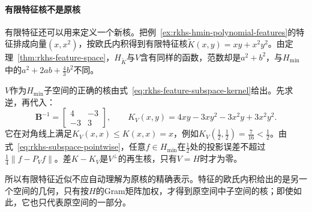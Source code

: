 \paragraph{有限特征核不是原核}

有限特征还可以用来定义一个新核。把例~\ref{ex:rkhs-hmin-polynomial-features}的特征排成向量$(x,x^2)$，按欧氏内积得到有限特征核$\widetilde K(x,y)=xy+x^2y^2$。由定理~\ref{thm:rkhs-feature-space}，$H_{\widetilde K}$与$V$含有同样的函数，范数却是$a^2+b^2$，与$H_{\min}$中的$a^2+2ab+\tfrac43b^2$不同。

$V$作为$H_{\min}$子空间的正确的核由式~\eqref{eq:rkhs-feature-subspace-kernel}给出。先求逆，再代入：
\[
\bm B^{-1}=\begin{bmatrix}4&-3\\-3&3\end{bmatrix},\qquad
K_V(x,y)=4xy-3xy^2-3x^2y+3x^2y^2 .
\]
它在对角线上满足$K_V(x,x)\leq K(x,x)=x$，例如$K_V(\tfrac12,\tfrac12)=\tfrac7{16}<\tfrac12$。由式~\eqref{eq:rkhs-subspace-pointwise}，任意$f\in H_{\min}$在$\tfrac12$处的投影误差不超过$\tfrac14\lVert f-P_Vf\rVert$。差$K-K_V$是$V^\perp$的再生核，只有$V=H$时才为零。

所以有限特征近似不应自动理解为原核的精确表示。特征的欧氏内积给出的是另一个空间的几何，只有按$H$的Gram矩阵加权，才得到原空间中子空间的核；即使如此，它也只代表原空间的一部分。
